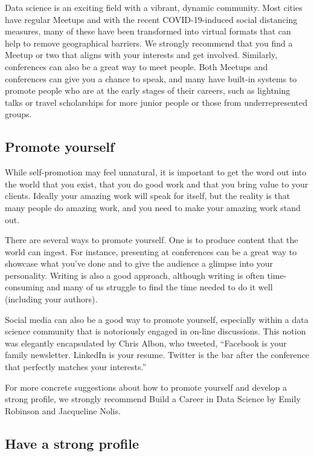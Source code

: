 \documentclass[
]{book}
\begin{document}
Data science is an exciting field with a vibrant, dynamic community. Most cities have regular Meetups and with the recent COVID-19-induced social distancing measures, many of these have been transformed into virtual formats that can help to remove geographical barriers. We strongly recommend that you find a Meetup or two that aligns with your interests and get involved. Similarly, conferences can also be a great way to meet people. Both Meetups and conferences can give you a chance to speak, and many have built-in systems to promote people who are at the early stages of their careers, such as lightning talks or travel scholarships for more junior people or those from underrepresented groups.

\hypertarget{promote-yourself}{%
\subsection{Promote yourself}\label{promote-yourself}}

While self-promotion may feel unnatural, it is important to get the word out into the world that you exist, that you do good work and that you bring value to your clients. Ideally your amazing work will speak for itself, but the reality is that many people do amazing work, and you need to make your amazing work stand out.

There are several ways to promote yourself. One is to produce content that the world can ingest. For instance, presenting at conferences can be a great way to showcase what you've done and to give the audience a glimpse into your personality. Writing is also a good approach, although writing is often time-consuming and many of us struggle to find the time needed to do it well (including your authors).

Social media can also be a good way to promote yourself, especially within a data science community that is notoriously engaged in on-line discussions. This notion was elegantly encapsulated by Chris Albon, who tweeted, ``Facebook is your family newsletter. LinkedIn is your resume. Twitter is the bar after the conference that perfectly matches your interests.''

For more concrete suggestions about how to promote yourself and develop a strong profile, we strongly recommend Build a Career in Data Science by Emily Robinson and Jacqueline Nolis.

\hypertarget{have-a-strong-profile}{%
\subsection{Have a strong profile}\label{have-a-strong-profile}}
\end{document}
